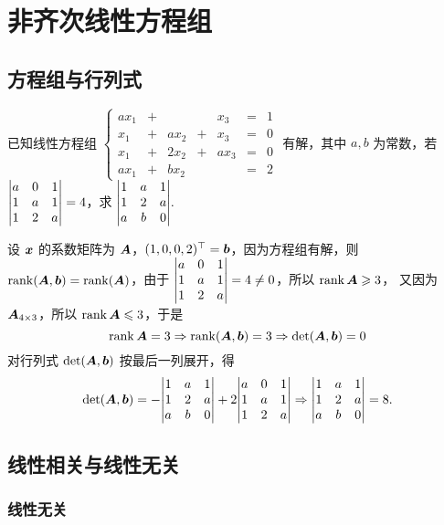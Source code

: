 \section{非齐次线性方程组}

\subsection{方程组与行列式}

\begin{example}
    已知线性方程组 $\left\{\begin{matrix}
        ax_1&+&&&x_3&=&1\\
        x_1&+&ax_2&+&x_3&=&0\\
        x_1&+&2x_2&+&ax_3&=&0\\
        ax_1&+&bx_2&&&=&2
        \end{matrix}\right.$ 有解，其中 $a,b$ 为常数，若 $\mqty|a&0&1\\1&a&1\\1&2&a|=4$，求 $\mqty|1&a&1\\1&2&a\\a&b&0|.$
\end{example}
\begin{solution}
    设 $\vb*{x}$ 的系数矩阵为 $\vb*{A}$，$(1,0,0,2)^\top=\vb*{b}$，因为方程组有解，则 $\rank(\vb*{A},\vb*{b})=\rank(\vb*{A})$，由于 $\mqty|a&0&1\\1&a&1\\1&2&a|=4\neq0$，所以 $\rank\vb*{A}\geqslant 3$，
    又因为 $\vb*{A}_{4\times3}$，所以 $\rank\vb*{A}\leqslant 3$，于是 $$\rank\vb*{A}=3\Rightarrow \rank(\vb*{A},\vb*{b})=3\Rightarrow\det(\vb*{A},\vb*{b})=0$$
    对行列式 $\det(\vb*{A},\vb*{b})$ 按最后一列展开，得 
    $$\det(\vb*{A},\vb*{b})=-\mqty|1&a&1\\1&2&a\\a&b&0|+2\mqty|a&0&1\\1&a&1\\1&2&a|\Rightarrow\mqty|1&a&1\\1&2&a\\a&b&0|=8. $$
\end{solution}

\subsection{线性相关与线性无关}

\subsubsection{线性无关}

